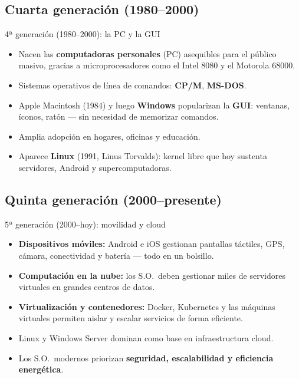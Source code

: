 \documentclass[xcolor=svgnames]{beamer}
\begin{document}
\subsection{Cuarta generación (1980--2000)}
\begin{frame}{4ª generación (1980--2000): la PC y la GUI}
  \begin{itemize}
    \item Nacen las \textbf{computadoras personales} (PC) asequibles para el público masivo, gracias a microprocesadores como el Intel 8080 y el Motorola 68000.
    \item Sistemas operativos de línea de comandos: \textbf{CP/M}, \textbf{MS-DOS}.
    \item Apple Macintosh (1984) y luego \textbf{Windows} popularizan la \textbf{GUI}: ventanas, íconos, ratón — sin necesidad de memorizar comandos.
    \item Amplia adopción en hogares, oficinas y educación.
    \item Aparece \textbf{Linux} (1991, Linus Torvalds): kernel libre que hoy sustenta servidores, Android y supercomputadoras.
  \end{itemize}
\end{frame}

\subsection{Quinta generación (2000--presente)}
\begin{frame}{5ª generación (2000--hoy): movilidad y cloud}
  \begin{itemize}
    \item \textbf{Dispositivos móviles:} Android e iOS gestionan pantallas táctiles, GPS, cámara, conectividad y batería — todo en un bolsillo.
    \item \textbf{Computación en la nube:} los S.O.\ deben gestionar miles de servidores virtuales en grandes centros de datos.
    \item \textbf{Virtualización y contenedores:} Docker, Kubernetes y las máquinas virtuales permiten aislar y escalar servicios de forma eficiente.
    \item Linux y Windows Server dominan como base en infraestructura cloud.
    \item Los S.O.\ modernos priorizan \textbf{seguridad, escalabilidad y eficiencia energética}.
  \end{itemize}
\end{frame}
\end{document}
